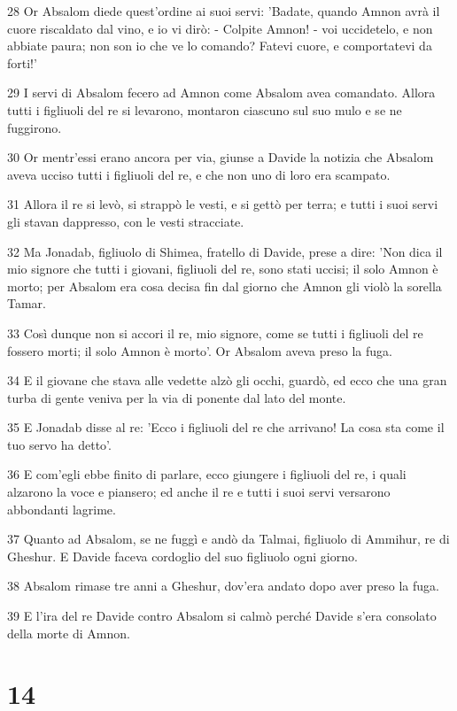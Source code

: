 \par 28 Or Absalom diede quest'ordine ai suoi servi: 'Badate, quando Amnon avrà il cuore riscaldato dal vino, e io vi dirò: - Colpite Amnon! - voi uccidetelo, e non abbiate paura; non son io che ve lo comando? Fatevi cuore, e comportatevi da forti!'
\par 29 I servi di Absalom fecero ad Amnon come Absalom avea comandato. Allora tutti i figliuoli del re si levarono, montaron ciascuno sul suo mulo e se ne fuggirono.
\par 30 Or mentr'essi erano ancora per via, giunse a Davide la notizia che Absalom aveva ucciso tutti i figliuoli del re, e che non uno di loro era scampato.
\par 31 Allora il re si levò, si strappò le vesti, e si gettò per terra; e tutti i suoi servi gli stavan dappresso, con le vesti stracciate.
\par 32 Ma Jonadab, figliuolo di Shimea, fratello di Davide, prese a dire: 'Non dica il mio signore che tutti i giovani, figliuoli del re, sono stati uccisi; il solo Amnon è morto; per Absalom era cosa decisa fin dal giorno che Amnon gli violò la sorella Tamar.
\par 33 Così dunque non si accori il re, mio signore, come se tutti i figliuoli del re fossero morti; il solo Amnon è morto'. Or Absalom aveva preso la fuga.
\par 34 E il giovane che stava alle vedette alzò gli occhi, guardò, ed ecco che una gran turba di gente veniva per la via di ponente dal lato del monte.
\par 35 E Jonadab disse al re: 'Ecco i figliuoli del re che arrivano! La cosa sta come il tuo servo ha detto'.
\par 36 E com'egli ebbe finito di parlare, ecco giungere i figliuoli del re, i quali alzarono la voce e piansero; ed anche il re e tutti i suoi servi versarono abbondanti lagrime.
\par 37 Quanto ad Absalom, se ne fuggì e andò da Talmai, figliuolo di Ammihur, re di Gheshur. E Davide faceva cordoglio del suo figliuolo ogni giorno.
\par 38 Absalom rimase tre anni a Gheshur, dov'era andato dopo aver preso la fuga.
\par 39 E l'ira del re Davide contro Absalom si calmò perché Davide s'era consolato della morte di Amnon.

\chapter{14}

